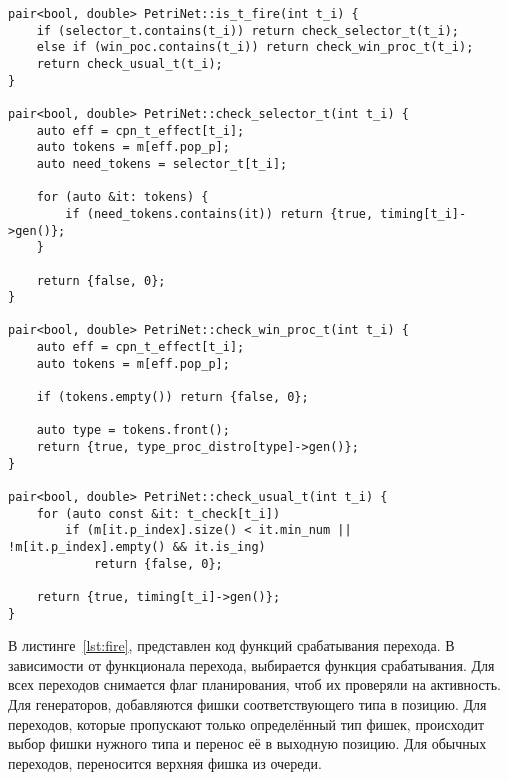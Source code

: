 \begin{center}
	\captionsetup{justification=raggedright,singlelinecheck=off}
	\begin{lstlisting}[label=lst:check,caption=Функции проверки автивности перехода ,showstringspaces=false]
pair<bool, double> PetriNet::is_t_fire(int t_i) {
	if (selector_t.contains(t_i)) return check_selector_t(t_i);
	else if (win_poc.contains(t_i)) return check_win_proc_t(t_i);
	return check_usual_t(t_i);
}

pair<bool, double> PetriNet::check_selector_t(int t_i) {
	auto eff = cpn_t_effect[t_i];
	auto tokens = m[eff.pop_p];
	auto need_tokens = selector_t[t_i];
	
	for (auto &it: tokens) {
		if (need_tokens.contains(it)) return {true, timing[t_i]->gen()};
	}
	
	return {false, 0};
}

pair<bool, double> PetriNet::check_win_proc_t(int t_i) {
	auto eff = cpn_t_effect[t_i];
	auto tokens = m[eff.pop_p];
	
	if (tokens.empty()) return {false, 0};
	
	auto type = tokens.front();
	return {true, type_proc_distro[type]->gen()};
}

pair<bool, double> PetriNet::check_usual_t(int t_i) {
	for (auto const &it: t_check[t_i])
		if (m[it.p_index].size() < it.min_num || !m[it.p_index].empty() && it.is_ing)
			return {false, 0};
	
	return {true, timing[t_i]->gen()};
}
	\end{lstlisting}
\end{center}
\FloatBarrier

В листинге~\ref{lst:fire}, представлен код функций срабатывания перехода. В зависимости от функционала перехода, выбирается функция срабатывания. Для всех переходов снимается флаг планирования, чтоб их проверяли на активность. Для генераторов, добавляются фишки соответствующего типа в позицию. Для переходов, которые пропускают только определённый тип фишек, происходит выбор фишки нужного типа и перенос её в выходную позицию. Для обычных переходов, переносится верхняя фишка из очереди.

